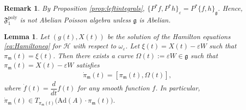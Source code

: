 \documentclass[11pt]{amsart}
\newtheorem{lemma}[theorem]{Lemma}
\theoremstyle{definition}
\theoremstyle{plain}
\newtheorem{remark}[theorem]{Remark}
\theoremstyle{conclusion}
\begin{document}
\begin{remark}
\label{rem:f1}
By Proposition \ref{prop:leftintegrals}, $\{P^*f,P^*h\}_\varepsilon=P^*\{f,h\}_{\mathfrak{g}}$. Hence, $\mathfrak{F}_1^{\mathrm{poly}}$ is not Abelian Poisson algebra unless $\mathfrak{g}$ is Abelian.
\end{remark}

\begin{lemma} 
\label{lem:lax}
Let $(g(t),X(t))$ be the solution of the Hamilton equations \eqref{eq:Hamiltoneq} for $\mathcal{H}$  with respect to $\omega_{\varepsilon}$. Let $\xi(t) = X(t) -\varepsilon W$ such that $\pi_\mathfrak{m}(t) = \xi(t)$. Then there exists a curve $\Omega(t) := \varepsilon W \in \mathfrak{g}$ such that $\pi_\mathfrak{m}(t) = X(t) -\varepsilon W$ satisfies \begin{align*}
\dot{\pi}_{\mathfrak{m}}(t)= [\pi_{\mathfrak{m}}(t),  \Omega(t)],
\end{align*} where $\dot{f} (t) = \dfrac{d}{dt} f(t)$ for any smooth function $f$. In particular, $\dot{\pi}_{\mathfrak{m}}(t)\in T_{\pi_{\mathfrak{m}}(t)}\big(\mathrm{Ad}(A)\cdot \pi_{\mathfrak{m}}(t)\big)$.
\end{lemma}
\end{document}
